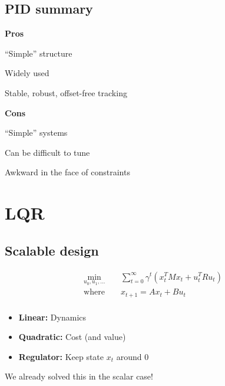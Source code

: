 \documentclass[
  letterpaper,
  DIV=11,
  numbers=noendperiod,
  oneside]{scrartcl}
\providecommand{\tightlist}{%
  \setlength{\itemsep}{0pt}\setlength{\parskip}{0pt}}\usepackage{longtable,booktabs,array}
\begin{document}
\subsection{PID summary}\label{pid-summary}

\textbf{Pros}

``Simple'' structure

Widely used

Stable, robust, offset-free tracking

\textbf{Cons}

``Simple'' systems

Can be difficult to tune

Awkward in the face of constraints


\section{LQR}\label{lqr}

\subsection{Scalable design}\label{scalable-design}

\begin{align}
\min_{u_0, u_1, \ldots} && \sum_{t=0}^{\infty} \gamma^t \left( x_{t}^{T} M x_t +  u_{t}^{T} R u_t \right)\\
\text{where } && x_{t+1} = A x_t + B u_t \\
\end{align}

\begin{itemize}
\tightlist
\item
  \textbf{Linear:} Dynamics
\item
  \textbf{Quadratic:} Cost (and value)
\item
  \textbf{Regulator:} Keep state \(x_t\) around \(0\)
\end{itemize}

We already solved this in the scalar case!

\end{document}

